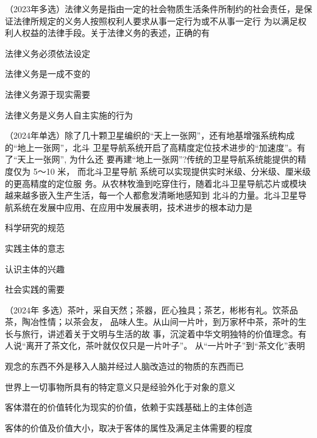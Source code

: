 \documentclass[lang=cn,newtx,10pt,scheme=chinese,pad,twocol]{zznote}
\begin{document}
\begin{example} （2023年多选）法律义务是指由一定的社会物质生活条件所制约的社会责任，是保 证法律所规定的义务人按照权利人要求从事一定行为或不从事一定行
	为以满足权利人权益的法律手段。关于法律义务的表述，正确的有

	\begin{choice}
		\item 法律义务必须依法设定
		\item 法律义务是一成不变的
		\item 法律义务源于现实需要
		\item 法律义务是义务人自主实施的行为
	\end{choice}
\end{example}

\begin{example}	（2024年单选）除了几十颗卫星编织的“天上一张网”，还有地基增强系统构成的“地上一张网”，北斗 卫星导航系统开启了高精度定位技术进步的“加速度”。有了“天上一张网”, 为什么还 要再建“地上一张网”?传统的卫星导航系统能提供的精度仅为 5～10 米， 而北斗卫星导航 系统可以实现提供实时米级、分米级、厘米级的更高精度的定位服 务。从农林牧渔到吃穿住行，随着北斗卫星导航芯片或模块越来越多嵌入生产生活，每一个人都愈发清晰地感知到 北斗的力量。北斗卫星导航系统在发展中应用、在应用中发展表明，技术进步的根本动力是
	\begin{choice}
		\item 科学研究的规范
		\item 实践主体的意志
		\item 认识主体的兴趣
		\item 社会实践的需要
	\end{choice}
\end{example}

\begin{example} （2024年 多选）茶叶，采自天然；茶器，匠心独具；茶艺，彬彬有礼。饮茶品茶，陶冶性情；以茶会友， 品味人生。从山间一片叶，到万家杯中茶，茶叶的生长与旅行，讲述着关于文明与生活的故 事，沉淀着中华文明独特的价值理念。有人说“离开了茶文化，茶叶就仅仅只是一片叶子”。 从“一片叶子”到“茶文化”表明
	\begin{choice}
		\item 观念的东西不外是移入人脑并经过人脑改造过的物质的东西而已
		\item 世界上一切事物所具有的特定意义只是经验外化于对象的意义
		\item 客体潜在的价值转化为现实的价值，依赖于实践基础上的主体创造
		\item 客体的价值及价值大小，取决于客体的属性及满足主体需要的程度
	\end{choice}
\end{example}
\end{document}
